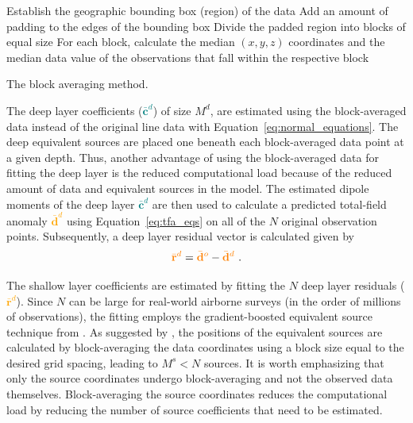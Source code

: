 \begin{algorithm}[!h]
  Establish the geographic bounding box (region) of the data
  \;
  Add an amount of padding to the edges of the bounding box
  \;
  Divide the padded region into blocks of equal size
  \;
  For each block, calculate the median $(x, y, z)$ coordinates and the median data value of the observations that fall within the respective block
  \;
  \BlankLine
  \caption{The block averaging method.}
  \label{alg:block_averaging}
\end{algorithm}


The deep layer coefficients (\textcolor{teal}{$\bar{\mathbf{c}}^d$}) of size $M^d$, are estimated using the block-averaged data instead of the original line data with Equation~\ref{eq:normal_equations}. The deep equivalent sources are placed one beneath each block-averaged data point at a given depth. Thus, another advantage of using the block-averaged data for fitting the deep layer is the reduced computational load because of the reduced amount of data and equivalent sources in the model. The estimated dipole moments of the deep layer \textcolor{teal}{$\bar{\mathbf{c}}^d$} are then used to calculate a predicted total-field anomaly \textcolor{orange}{$\bar{\mathbf{d}}^d$} using Equation~\ref{eq:tfa_eqs} on all of the $N$ original observation points.
Subsequently, a deep layer residual vector is calculated given by
\begin{equation}
    \textcolor{orange}{\bar{\mathbf{r}}^d} = \textcolor{orange}{\bar{\mathbf{d}}^o} - \textcolor{orange}{\bar{\mathbf{d}}^d}
    \ .
    \label{eq:deep_residual}
\end{equation}

The shallow layer coefficients are estimated by fitting the $N$ deep layer residuals (\textcolor{orange}{$\bar{\mathbf{r}}^d$}). Since $N$ can be large for real-world airborne surveys (in the order of millions of observations), the fitting employs the gradient-boosted equivalent source technique from \citet{Soler2021}. As suggested by \citet{Soler2021}, the positions of the equivalent sources are calculated by block-averaging the data coordinates using a block size equal to the desired grid spacing, leading to $M^s < N$ sources. It is worth emphasizing that only the source coordinates undergo block-averaging and not the observed data themselves. Block-averaging the source coordinates reduces the computational load by reducing the number of source coefficients that need to be estimated.

